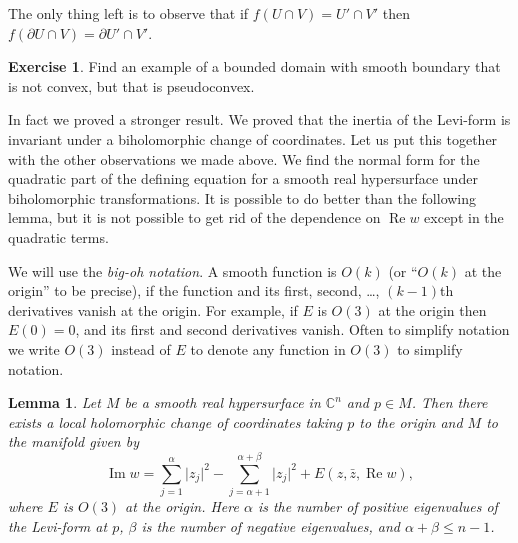 \documentclass[12pt,openany]{book}
\renewcommand{\Re}{\operatorname{Re}}
\renewcommand{\Im}{\operatorname{Im}}
\newcommand{\sabs}[1]{\lvert {#1} \rvert}
\newcommand{\C}{{\mathbb{C}}}
\newcommand{\myindex}[1]{#1\index{#1}}
\theoremstyle{plain}
\newtheorem{lemma}[thm]{Lemma}
\theoremstyle{remark}
\theoremstyle{definition}
\newenvironment{exbox}{%
    \def\FrameCommand{\vrule width 1pt \relax\hspace {10pt}}%
    \MakeFramed {\advance \hsize -\width \FrameRestore }%
}{%
    \endMakeFramed
}
\theoremstyle{exercise}
\newtheorem{exercise}{Exercise}[section]
\theoremstyle{example}
\begin{document}
\begin{center}

\end{center}

The only thing left is to observe that if
$f(U \cap V) = U' \cap V'$ then $f(\partial U \cap V) = \partial U' \cap
V'$.

\begin{exbox}
\begin{exercise}
Find an example of a bounded domain with smooth boundary that is not convex,
but that is pseudoconvex.
\end{exercise}
\end{exbox}

In fact we proved a stronger result.  We proved that the inertia
of the Levi-form is invariant under a biholomorphic change of coordinates.
Let us put this together with the other observations we made above.
We find the normal form for the
quadratic part of the defining equation for a smooth real hypersurface under biholomorphic transformations.
It is possible to do better than the following lemma, but it is not possible
to get rid of the dependence on $\Re w$ except in the quadratic
terms.

We will use the \emph{\myindex{big-oh notation}}.
A smooth function is $O(k)$ (or ``$O(k)$ at the origin'' to be
precise), if
the function and its first, second, \ldots, $(k-1)$th
derivatives vanish at the origin.
For example, if $E$ is $O(3)$ at the origin
then $E(0)=0$, and its first and second derivatives vanish.
Often to simplify notation we write
$O(3)$ instead of $E$ to denote any function in $O(3)$ to simplify notation.

\begin{lemma} \label{lemma:normformquad}
Let $M$ be a smooth real hypersurface in $\C^n$ and $p \in M$.  Then there
exists a local holomorphic change of coordinates taking $p$ to the origin
and $M$ to the manifold given by
\begin{equation*}
\Im w = \sum_{j=1}^\alpha \sabs{z_j}^2 - \sum_{j=\alpha+1}^{\alpha+\beta}
\sabs{z_j}^2 +
E(z,\bar{z},\Re w) ,
\end{equation*}
where $E$ is $O(3)$ at the origin.
Here $\alpha$ is the number of positive eigenvalues of the Levi-form at $p$,
$\beta$ is the number of negative eigenvalues, and $\alpha+\beta \leq
n-1$.
\end{lemma}

\end{document}
